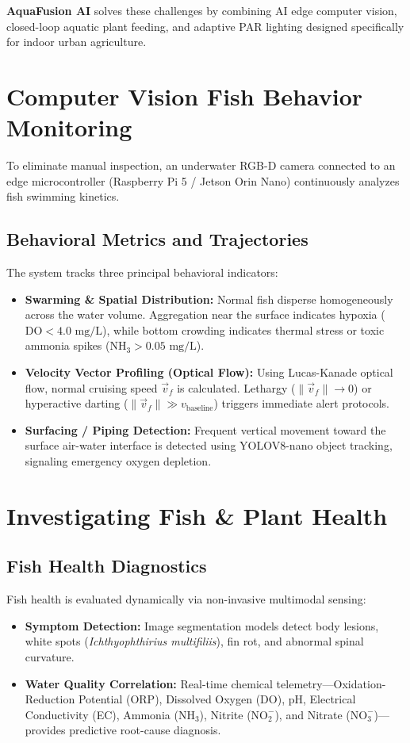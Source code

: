 \documentclass[12pt,a4paper]{article}
\begin{document}
\textbf{AquaFusion AI} solves these challenges by combining AI edge computer vision, closed-loop aquatic plant feeding, and adaptive PAR lighting designed specifically for indoor urban agriculture.

\section{Computer Vision Fish Behavior Monitoring}
To eliminate manual inspection, an underwater RGB-D camera connected to an edge microcontroller (Raspberry Pi 5 / Jetson Orin Nano) continuously analyzes fish swimming kinetics.

\subsection{Behavioral Metrics and Trajectories}
The system tracks three principal behavioral indicators:
\begin{itemize}
    \item \textbf{Swarming \& Spatial Distribution:} Normal fish disperse homogeneously across the water volume. Aggregation near the surface indicates hypoxia ($\text{DO} < 4.0\text{ mg/L}$), while bottom crowding indicates thermal stress or toxic ammonia spikes ($\text{NH}_3 > 0.05\text{ mg/L}$).
    \item \textbf{Velocity Vector Profiling (Optical Flow):} Using Lucas-Kanade optical flow, normal cruising speed $\vec{v}_f$ is calculated. Lethargy ($\|\vec{v}_f\| \rightarrow 0$) or hyperactive darting ($\|\vec{v}_f\| \gg v_{\text{baseline}}$) triggers immediate alert protocols.
    \item \textbf{Surfacing / Piping Detection:} Frequent vertical movement toward the surface air-water interface is detected using YOLOV8-nano object tracking, signaling emergency oxygen depletion.
\end{itemize}

\section{Investigating Fish \& Plant Health}

\subsection{Fish Health Diagnostics}
Fish health is evaluated dynamically via non-invasive multimodal sensing:
\begin{itemize}
    \item \textbf{Symptom Detection:} Image segmentation models detect body lesions, white spots (\textit{Ichthyophthirius multifiliis}), fin rot, and abnormal spinal curvature.
    \item \textbf{Water Quality Correlation:} Real-time chemical telemetry—Oxidation-Reduction Potential (ORP), Dissolved Oxygen (DO), pH, Electrical Conductivity (EC), Ammonia ($\text{NH}_3$), Nitrite ($\text{NO}_2^-$), and Nitrate ($\text{NO}_3^-$)—provides predictive root-cause diagnosis.
\end{itemize}
\end{document}
